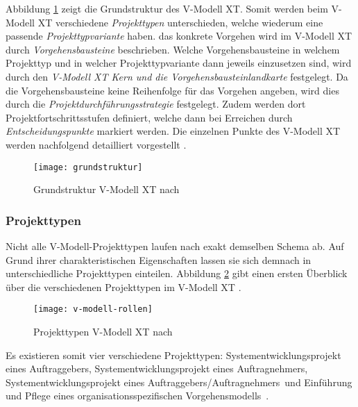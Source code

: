 Abbildung \ref{fig:grundstruktur} zeigt die Grundstruktur des V-Modell XT. Somit werden beim V-Modell XT verschiedene \textit{Projekttypen} unterschieden, welche wiederum eine passende \textit{Projekttypvariante} haben. das konkrete Vorgehen wird im V-Modell XT durch \textit{Vorgehensbausteine} beschrieben. Welche Vorgehensbausteine in welchem Projekttyp und in welcher Projekttypvariante dann jeweils einzusetzen sind, wird durch den \textit{V-Modell XT Kern und die Vorgehensbausteinlandkarte} festgelegt. Da die Vorgehensbausteine keine Reihenfolge für das Vorgehen angeben, wird dies durch die \textit{Projektdurchführungsstrategie} festgelegt. Zudem werden dort Projektfortschrittsstufen definiert, welche dann bei Erreichen durch \textit{Entscheidungspunkte} markiert werden. Die einzelnen Punkte des V-Modell XT werden nachfolgend detailliert vorgestellt \cite{2004vmodell}.
\begin{figure}[htp]
\begin{center}
  \texttt{[image: grundstruktur]} %
  \caption{Grundstruktur V-Modell XT nach \cite{2004vmodell}}
  \label{fig:grundstruktur}
\end{center}
\end{figure}

\subsubsection{Projekttypen}
Nicht alle V-Modell-Projekttypen laufen nach exakt demselben Schema ab. Auf Grund ihrer charakteristischen Eigenschaften lassen sie sich demnach in unterschiedliche Projekttypen einteilen. Abbildung \ref{fig:Projekttypen} gibt einen ersten Überblick über die verschiedenen Projekttypen im V-Modell XT \cite{2004vmodell}.

\begin{figure}[htp]
\begin{center}
  \texttt{[image: v-modell-rollen]} %
  \caption{Projekttypen V-Modell XT nach \cite{2004vmodell}}
  \label{fig:Projekttypen}
\end{center}
\end{figure}

Es existieren somit vier verschiedene Projekttypen: \grqq Systementwicklungsprojekt eines Auftraggebers\grqq, \grqq Systementwicklungsprojekt eines Auftragnehmers\grqq, \grqq Systementwicklungsprojekt eines Auftraggebers/Auftragnehmers\grqq \ und \grqq Einführung und Pflege eines organisationsspezifischen Vorgehensmodells\grqq \ \cite{reinhard2008}. \newline

